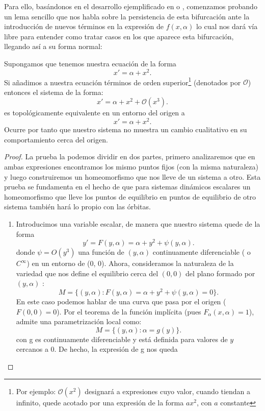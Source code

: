 \begin{enumerate}
 	Para ello, basándonos en el desarrollo ejemplificado en \cite{Kuznet} o \cite{murdock}, comenzamos probando un lema sencillo que nos habla sobre la persistencia de esta bifurcación ante la introducción de nuevos términos en la expresión de $f(x,\alpha)$ lo cual nos dará vía libre para entender como tratar casos en los que aparece esta bifurcación, llegando así a su forma normal:
 	\begin{lemma}
 		Supongamos que tenemos nuestra ecuación de la forma \[ x' = {\alpha}+ x^2 .\]
 		Si añadimos a nuestra ecuación términos de orden superior\footnote{Por ejemplo: $\mathcal{O}(x^2)$ designará a expresiones  cuyo valor, cuando tiendan a infinito, quede acotado por una expresión de la forma $ax^2$, con $a$ constante } (denotados por $\mathcal{O}$) entonces el sistema de la forma:
 		\begin{equation}
 		x' = {\alpha}+ x^2 + \mathcal{O}(x^3) .
 		\label{fold3}
 		\end{equation}
 		es topológicamente equivalente en un entorno del origen a 
 		\[ x' = \alpha + x^2. \]
 		Ocurre por tanto que nuestro sistema no muestra un cambio cualitativo en su comportamiento cerca del origen.
 	\end{lemma}
\begin{proof}
	La prueba la podemos dividir en dos partes, primero analizaremos que en ambas expresiones encontramos los mismo puntos fijos (con la misma naturaleza) y luego construiremos un homeomorfismo que nos lleve de un sistema a otro. Esta prueba se fundamenta en el hecho de que para sistemas dinámicos escalares un homeomorfismo que lleve los puntos de equilibrio en puntos de equilibrio de otro sistema también hará lo propio con las órbitas.
	\begin{enumerate}
		\item Introducimos una variable escalar, de manera que nuestro sistema quede de la forma
		\[ y' = F (y, \alpha) = \alpha + y^2 + \psi(y,\alpha) .\]
		donde $ \psi = O(y^3 )$ una función de $(y,\alpha)$ continuamente diferenciable ( o $C^\infty$) en un entorno de (0, 0). Ahora, consideramos la naturaleza de la variedad que nos define el equilibrio cerca del $(0, 0)$ del plano formado por $(y,\alpha)$ :
		\[ M = \{(y,\alpha) : F (y,\alpha) = \alpha + y^2 + \psi(y,\alpha) = 0\} .\]
		En este caso podemos hablar de una curva que pasa por el origen ($F(0,0)=0$). Por el teorema de la función implícita (pues $F_\alpha(x,\alpha)=1$), admite una parametrización local como:
		\[ M = \{(y,\alpha) : \alpha = g(y)\} . \]
		con g es continuamente diferenciable y está definida para valores de $y$ cercanos a $0$. De hecho, la expresión de g nos queda

\end{enumerate}
\end{proof}
\end{enumerate}
